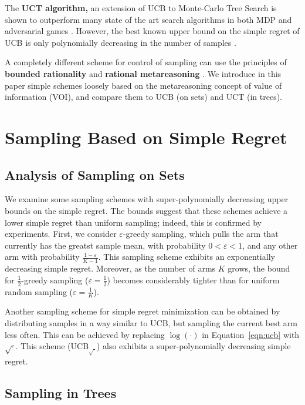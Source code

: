 \documentclass[letterpaper]{article}
\begin{document}
The {\bf UCT algorithm,} an extension of UCB
to Monte-Carlo Tree Search \cite{Kocsis.uct} is
shown to outperform many state of the art search algorithms in both
MDP and adversarial games \cite{Eyerich.ctp,GellyWang.mogo}. 
However, the best known upper bound on the simple regret of UCB is
only polynomially decreasing in the number of samples \cite{Bubeck.pure}.

A completely different scheme for control of sampling can use the
principles of {\bf bounded rationality} \cite{Horvitz.reasoningabout}
and {\bf rational metareasoning} \cite{Russell.right}. We introduce in this paper simple
schemes loosely based on the metareasoning concept of value of
information (VOI), and compare them to UCB (on sets) and UCT (in trees).


\section{Sampling Based on Simple Regret}
\label{sec:results}

\subsection{Analysis of Sampling on Sets}
\label{sec:sampling-on-sets}


We examine some sampling schemes with super-polynomially
decreasing upper bounds on the simple regret. The bounds
suggest that these schemes achieve a lower simple regret
than uniform sampling; indeed, this is confirmed
by experiments. First, we consider $\varepsilon$-greedy sampling, which
pulls the arm that currently has the greatst sample mean, with probability
$0<\varepsilon<1$, and any other arm with probability $\frac {1-\varepsilon} {K-1}$. 
This sampling scheme exhibits an exponentially decreasing simple
regret. Moreover, as the number of arms $K$ grows, the bound for $\frac 1
2$-greedy sampling ($\varepsilon=\frac 1 2$) becomes considerably tighter than for uniform
random sampling ($\varepsilon=\frac 1 K$).

Another sampling scheme for simple regret minimization can be obtained
by distributing samples in a way similar to UCB, but sampling the current best arm
less often. This can be achieved by replacing $\log(\cdot)$ in
Equation~\ref{eqn:ucb} with $\sqrt\cdot$. This scheme (UCB$_{\sqrt{\cdot}}$) also exhibits
a super-polynomially decreasing simple regret.

\subsection{Sampling in Trees}
\label{sec:sampling-in-trees}
\end{document}
